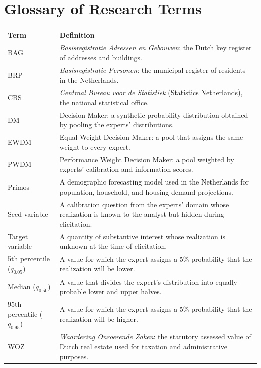 \chapter*{Glossary of Research Terms}

\begin{longtable}{p{2.7cm}p{10.2cm}}
    \toprule
    \textbf{Term} & \textbf{Definition} \\
    \midrule\endhead
    BAG & \textit{Basisregistratie Adressen en Gebouwen}: the Dutch key register of addresses and buildings. \\
    BRP & \textit{Basisregistratie Personen}: the municipal register of residents in the Netherlands. \\
    CBS & \textit{Centraal Bureau voor de Statistiek} (Statistics Netherlands), the national statistical office. \\
    DM & Decision Maker: a synthetic probability distribution obtained by pooling the experts' distributions. \\
    EWDM & Equal Weight Decision Maker: a pool that assigns the same weight to every expert. \\
    PWDM & Performance Weight Decision Maker: a pool weighted by experts' calibration and information scores. \\
    Primos & A demographic forecasting model used in the Netherlands for population, household, and housing-demand projections. \\
    Seed variable & A calibration question from the experts' domain whose realization is known to the analyst but hidden during elicitation. \\
    Target variable & A quantity of substantive interest whose realization is unknown at the time of elicitation. \\
    5th percentile ($q_{0.05}$) & A value for which the expert assigns a 5\% probability that the realization will be lower. \\
    Median ($q_{0.50}$) & A value that divides the expert's distribution into equally probable lower and upper halves. \\
    95th percentile ($q_{0.95}$) & A value for which the expert assigns a 5\% probability that the realization will be higher. \\
    WOZ & \textit{Waardering Onroerende Zaken}: the statutory assessed value of Dutch real estate used for taxation and administrative purposes. \\
    \bottomrule
\end{longtable}
